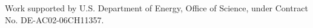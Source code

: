 \documentclass[pdf]{iucr}              %
\begin{document}
Work supported by U.S. Department of Energy, Office of Science, under Contract No. DE-AC02-06CH11357. 




 
\end{document}
